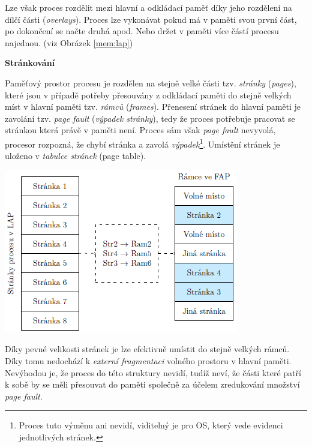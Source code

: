 Lze však proces rozdělit mezi hlavní a odkládací paměť díky jeho rozdělení na dílčí části (\textit{overlays}). Proces lze vykonávat pokud má v paměti svou první část, po dokončení se načte druhá apod. Nebo držet v paměti více částí procesu najednou. (viz Obrázek \ref{mem:lap})

\begin{Large}
    \vspace{0,5cm}
    \textbf{Stránkování}
\end{Large}

Paměťový prostor procesu je rozdělen na stejně velké části tzv. \textit{stránky} (\textit{pages}), které jsou v případě potřeby přesouvány z odkládací paměti do stejně velkých míst v hlavní paměti tzv. \textit{rámců} (\textit{frames}). Přenesení stránek do hlavní paměti je zavolání tzv. \textit{page fault} (\textit{výpadek stránky}), tedy že proces potřebuje pracovat se stránkou která právě v paměti není. Proces sám však \textit{page fault} nevyvolá, procesor rozpozná, že chybí stránka a zavolá \textit{výpadek}\footnote{Proces tuto výměnu ani nevidí, viditelný je pro OS, který vede evidenci jednotlivých stránek.}. Umístění stránek je uloženo v \textit{tabulce stránek} (page table).

\begin{center}
    \includegraphics[scale=1]{images/mem_page_table.png}
\end{center}

Díky pevné velikosti stránek je lze efektivně umístit do stejně velkých rámců. Díky tomu nedochází k \textit{externí fragmentaci} volného prostoru v hlavní paměti. Nevýhodou je, že proces do této struktury nevidí, tudíž neví, že části které patří k sobě by se měli přesouvat do paměti společně za účelem zredukování množství \textit{page fault}.

\vspace{0,5cm}

